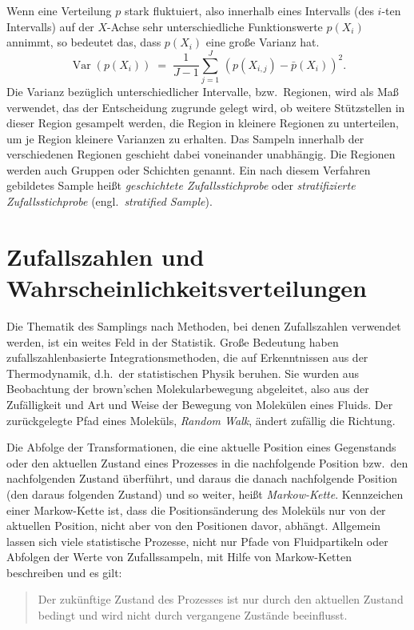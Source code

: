 Wenn eine Verteilung $p$ stark fluktuiert, also innerhalb eines
Intervalls (des $i$-ten Intervalls) auf der $X$-Achse sehr unterschiedliche Funktionswerte $p(X_i)$ annimmt,
so bedeutet das, dass $p(X_i)$ eine große Varianz hat.
\begin{equation}
\operatorname{Var}(p(X_i)) \; = \; \frac{1}{J-1} \sum_{j=1}^J \, \left(p(X_{i,j})- \bar p(X_i)\right)^2 .
\end{equation}
Die Varianz bezüglich unterschiedlicher Intervalle, bzw.\ Regionen, wird als Maß verwendet,
das der Entscheidung zugrunde gelegt wird, ob weitere Stützstellen in dieser Region
gesampelt werden, die Region in kleinere Regionen zu unterteilen, um je Region kleinere Varianzen
zu erhalten.
Das Sampeln innerhalb der verschiedenen Regionen geschieht dabei
voneinander unabhängig. Die Regionen werden auch Gruppen oder Schichten genannt.
Ein nach diesem Verfahren gebildetes Sample heißt \textsl{geschichtete Zufallsstichprobe}
oder \textsl{stratifizierte Zufallsstichprobe} (engl.\ \textsl{stratified Sample}).

\section{Zufallszahlen und Wahrscheinlichkeitsverteilungen}
Die Thematik des Samplings nach Methoden, bei denen Zufallszahlen verwendet werden, ist ein
weites Feld in der Statistik. Große Bedeutung haben zufallszahlenbasierte Integrationsmethoden,
die auf Erkenntnissen aus der Thermodynamik, d.h.\ der statistischen Physik beruhen.
Sie wurden aus Beobachtung der brown'schen Molekularbewegung abgeleitet, also aus der
Zufälligkeit und Art und Weise der Bewegung von Molekülen eines Fluids.
Der zurückgelegte Pfad eines Moleküls, \textsl{Random Walk},
ändert zufällig die Richtung.

Die Abfolge der Transformationen, die eine aktuelle Position eines Gegenstands oder den
aktuellen Zustand eines Prozesses in die nachfolgende Position bzw.\ den nachfolgenden
Zustand überführt, und daraus die danach nachfolgende Position (den daraus folgenden Zustand)
und so weiter, heißt \textsl{Markow-Kette}. Kennzeichen einer Markow-Kette ist, dass die
Positions\-änder\-ung des Moleküls nur von der aktuellen Position,
nicht aber von den Positionen davor, abhängt. Allgemein lassen sich viele statistische Prozesse,
nicht nur Pfade von Fluidpartikeln oder Abfolgen der Werte von Zufallssampeln, mit Hilfe von
Markow-Ketten beschreiben und es gilt:
\begin{quote}
Der zukünftige Zustand des Prozesses ist nur durch den
aktuellen Zustand bedingt und wird nicht durch vergangene Zustände beeinflusst.
\end{quote}

